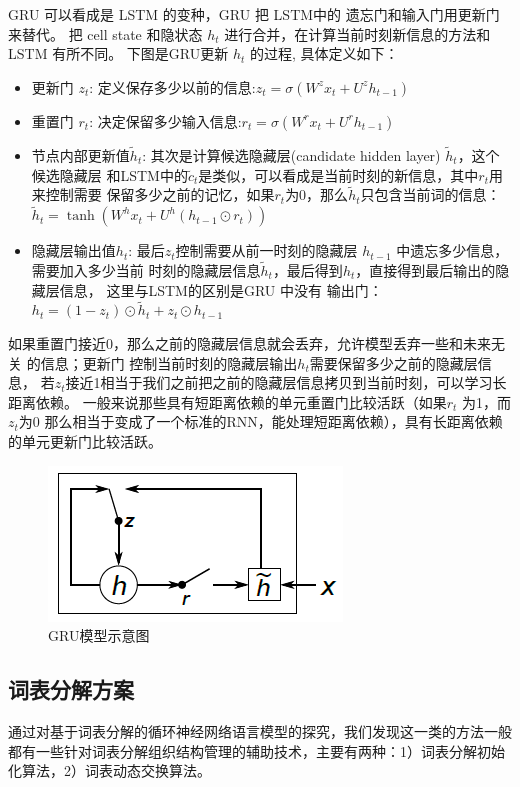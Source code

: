 \documentclass[12pt,a4paper]{article}
\begin{document}
GRU 可以看成是 LSTM 的变种，GRU 把 LSTM中的 遗忘门和输入门用更新门来替代。 把 cell state 和隐状态 $h_t$ 进行合并，在计算当前时刻新信息的方法和 LSTM 有所不同。 下图是GRU更新 $h_t$ 的过程\cite{DBLP:journals/corr/Pezeshki15}, 具体定义如下：
\begin{itemize}
\item 更新门 $z_t$: 定义保存多少以前的信息:$z_t = \sigma ( W^z x_t+ U^z h_{t-1}  )$

\item 重置门 $r_t$: 决定保留多少输入信息:$r_t = \sigma(W^r x_t  + U^r h_{t-1}  )$

\item 节点内部更新值$\tilde h_t $: 其次是计算候选隐藏层(candidate hidden layer) $\tilde h_t$，这个候选隐藏层 和LSTM中的$\tilde c_t$是类似，可以看成是当前时刻的新信息，其中$r_t$用来控制需要 保留多少之前的记忆，如果$r_t$为0，那么$\tilde h_t$只包含当前词的信息：$\tilde h_t  = \tanh (W^h x_t  + U^h(h_{t-1} \odot r_t) )$

\item 隐藏层输出值$h_t$: 最后$z_t$控制需要从前一时刻的隐藏层 $h_{t-1}$ 中遗忘多少信息，需要加入多少当前 时刻的隐藏层信息$\tilde h_t$，最后得到$h_t$，直接得到最后输出的隐藏层信息， 这里与LSTM的区别是GRU 中没有 输出门：$h_t = (1-z_t)\odot \tilde h_t  + z_t \odot h_{t-1}$
\end{itemize}
如果重置门接近0，那么之前的隐藏层信息就会丢弃，允许模型丢弃一些和未来无关 的信息；更新门 控制当前时刻的隐藏层输出$h_t$需要保留多少之前的隐藏层信息， 若$z_t$接近1相当于我们之前把之前的隐藏层信息拷贝到当前时刻，可以学习长距离依赖。 一般来说那些具有短距离依赖的单元重置门比较活跃（如果$r_t$ 为1，而$z_t$为$0$ 那么相当于变成了一个标准的RNN，能处理短距离依赖），具有长距离依赖的单元更新门比较活跃。

\begin{figure}
  \centering
  \includegraphics[width=0.5\linewidth]{./figures/gru}
  \caption{GRU模型示意图}\label{fig:gru}
\end{figure}


\subsection{词表分解方案}
通过对基于词表分解的循环神经网络语言模型的探究，我们发现这一类的方法一般都有一些针对词表分解组织结构管理的辅助技术，主要有两种：1）词表分解初始化算法，2）词表动态交换算法。
\end{document}

